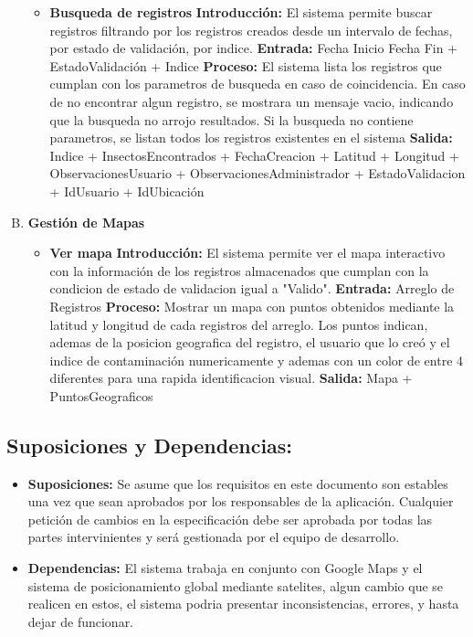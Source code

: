 \begin{enumerate}[A.]
\begin{itemize}
          \item \textbf{Busqueda de registros}
            \tab \textbf{Introducción:} El sistema permite buscar registros filtrando por los registros creados desde un intervalo de fechas, por estado de validación, por indice.
            \tab \textbf{Entrada:} Fecha Inicio Fecha Fin + EstadoValidación + Indice
            \tab \textbf{Proceso:} El sistema lista los registros que cumplan con los parametros de busqueda en caso de coincidencia. En caso de no encontrar algun registro, se mostrara un mensaje vacio, indicando que la busqueda no arrojo resultados. Si la busqueda no contiene parametros, se listan todos los registros existentes en el sistema
            \tab \textbf{Salida:} Indice + InsectosEncontrados + FechaCreacion + Latitud + Longitud + ObservacionesUsuario + ObservacionesAdministrador + EstadoValidacion + IdUsuario + IdUbicación
        \end{itemize}

      \item \textbf{Gestión de Mapas}
        \begin{itemize}
          \item \textbf{Ver mapa}
          \tab \textbf{Introducción:} El sistema permite ver el mapa interactivo con la información de los registros almacenados que cumplan con la condicion de estado de validacion igual a "Valido".
          \tab \textbf{Entrada:} Arreglo de Registros 
          \tab \textbf{Proceso:} Mostrar un mapa con puntos obtenidos mediante la latitud y longitud de cada registros del arreglo.
          Los puntos indican, ademas de la posicion geografica del registro, el usuario que lo creó y el indice de contaminación numericamente y ademas con un color de entre 4 diferentes para una rapida identificacion visual.
          \tab \textbf{Salida:} Mapa + PuntosGeograficos
        \end{itemize}

    \end{enumerate}

    \subsection{Suposiciones y Dependencias:}
      \begin{itemize}
        \item \textbf{Suposiciones:} Se asume que los requisitos en este documento son estables una vez que sean aprobados por los responsables de la aplicación. Cualquier petición de cambios en la especificación debe ser aprobada por todas las partes intervinientes y será gestionada por el equipo de desarrollo.
        \item \textbf{Dependencias:} El sistema trabaja en conjunto con Google Maps y el sistema de posicionamiento global mediante satelites, algun cambio que se realicen en estos, el sistema podria presentar inconsistencias, errores, y hasta dejar de funcionar.
      \end{itemize}

